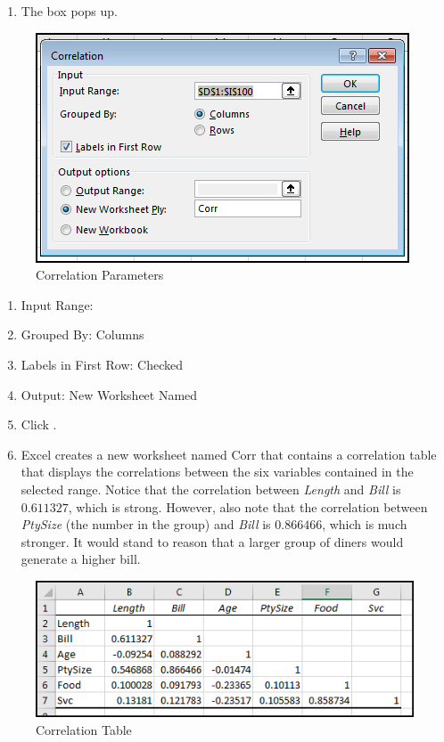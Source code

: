 \begin{enumerate}[resume]
	\item The  box pops up.
\end{enumerate}

\begin{figure}[H]
	\centering
	\includegraphics[width=\maxwidth{.95\linewidth}]{gfx/ch09_fig55}
	\caption{Correlation Parameters}
	\label{09:fig55}
\end{figure}

\begin{enumerate}[resume]
	\item Input Range: 
	\item Grouped By: Columns
	\item Labels in First Row: Checked
	\item Output: New Worksheet Named 
	\item Click .
	\item Excel creates a new worksheet named Corr that contains a correlation table that displays the correlations between the six variables contained in the selected range. Notice that the correlation between \textit{Length} and \textit{Bill} is $ 0.611327 $, which is strong. However, also note that the correlation between \textit{PtySize} (the number in the group) and \textit{Bill} is $ 0.866466 $, which is much stronger. It would stand to reason that a larger group of diners would generate a higher bill.
\end{enumerate}

\begin{figure}[H]
	\centering
	\includegraphics[width=\maxwidth{.95\linewidth}]{gfx/ch09_fig56}
	\caption{Correlation Table}
	\label{09:fig56}
\end{figure}

